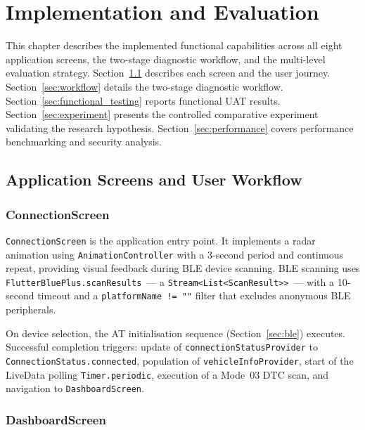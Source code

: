 \chapter{Implementation and Evaluation}
\label{ch:implementation}

This chapter describes the implemented functional capabilities across all eight application screens, the two-stage diagnostic workflow, and the multi-level evaluation strategy.
Section~\ref{sec:screens} describes each screen and the user journey.
Section~\ref{sec:workflow} details the two-stage diagnostic workflow.
Section~\ref{sec:functional_testing} reports functional UAT results.
Section~\ref{sec:experiment} presents the controlled comparative experiment validating the research hypothesis.
Section~\ref{sec:performance} covers performance benchmarking and security analysis.

\section{Application Screens and User Workflow}
\label{sec:screens}

\subsection{ConnectionScreen}

\texttt{ConnectionScreen} is the application entry point.
It implements a radar animation using \texttt{AnimationController} with a 3-second period and continuous repeat, providing visual feedback during BLE device scanning.
BLE scanning uses \texttt{FlutterBluePlus.scanResults}~--- a \texttt{Stream<List<ScanResult>>}~--- with a 10-second timeout and a \texttt{platformName != ""} filter that excludes anonymous BLE peripherals.

On device selection, the AT initialisation sequence (Section~\ref{sec:ble}) executes.
Successful completion triggers: update of \texttt{connectionStatusProvider} to \texttt{ConnectionStatus.connected}, population of \texttt{vehicleInfoProvider}, start of the LiveData polling \texttt{Timer.periodic}, execution of a Mode~03 DTC scan, and navigation to \texttt{DashboardScreen}.


\subsection{DashboardScreen}

